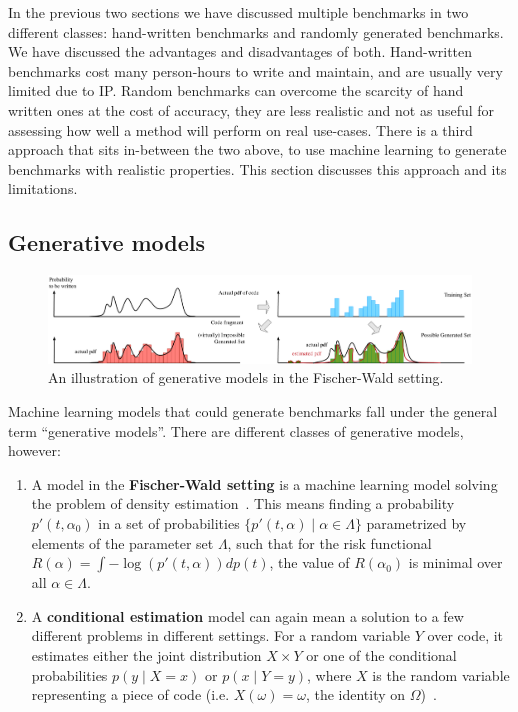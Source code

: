 In the previous two sections we have discussed multiple benchmarks in two different classes: hand-written benchmarks and randomly generated benchmarks.
We have discussed the advantages and disadvantages of both.
Hand-written benchmarks cost many person-hours to write and maintain, and are usually very limited due to \ac{IP}.
Random benchmarks can overcome the scarcity of hand written ones at the cost of accuracy, they are less realistic and not as useful for assessing how well a method will perform on real use-cases.
There is a third approach that sits in-between the two above, to use machine learning to generate benchmarks with realistic properties.
This section discusses this approach and its limitations.

\subsection{Generative models}
\label{sec:generative}

\begin{figure}[th]
	\centering
	\includegraphics[width=\textwidth]{figures/illustration_histograms_ideal.pdf}
	\caption{An illustration of generative models in the Fischer-Wald setting.}
	\label{fig:histograms}
\end{figure}

Machine learning models that could generate benchmarks fall under the general term ``generative models''.
There are different classes of generative models, however:
\begin{enumerate}
\item \label{fischer-wald} A model in the \textbf{Fischer-Wald setting} is a machine learning model solving the problem of density estimation~\cite{vapnik}. This means finding a probability $p'(t,\alpha_0)$ in a set of probabilities $\{ p'(t,\alpha) \mid \alpha \in \Lambda \}$ parametrized by elements of the parameter set $\Lambda$,
  such that for the risk functional $R(\alpha) = \int -\log(p'(t,\alpha)) dp(t)$, the value of $R(\alpha_0)$ is minimal over all $\alpha \in \Lambda$.
\item \label{conditional-estimation} A \textbf{conditional estimation} model can again mean a solution to a few different problems in different settings. For a random variable $Y$ over code, it estimates either the joint distribution $X \times Y$ or one of the conditional probabilities $p(y \mid X = x)$ or $p(x \mid Y = y)$, where $X$ is the random variable representing a piece of code (i.e. $X(\omega) = \omega$, the identity on $\Omega$)~\cite{vapnik}.

\end{enumerate}

